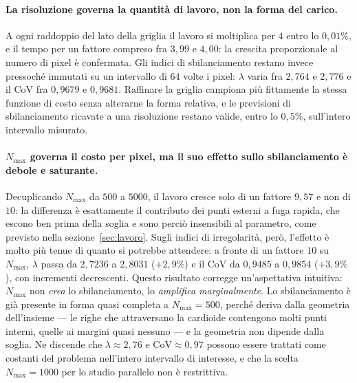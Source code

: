 \paragraph{La risoluzione governa la quantità di lavoro, non la forma del carico.}
A ogni raddoppio del lato della griglia il lavoro si moltiplica per $4$ entro lo
$0{,}01\%$, e il tempo per un fattore compreso fra $3{,}99$ e $4{,}00$: la
crescita proporzionale al numero di pixel è confermata. Gli indici di
sbilanciamento restano invece pressoché immutati su un intervallo di $64$ volte
i pixel: $\lambda$ varia fra $2{,}764$ e $2{,}776$ e il $\mathrm{CoV}$ fra
$0{,}9679$ e $0{,}9681$. Raffinare la griglia campiona più fittamente la stessa
funzione di costo senza alterarne la forma relativa, e le previsioni di
sbilanciamento ricavate a una risoluzione restano valide, entro lo $0{,}5\%$,
sull'intero intervallo misurato.


\paragraph{$N_{\max}$ governa il costo per pixel, ma il suo effetto sullo
sbilanciamento è debole e saturante.}
Decuplicando $N_{\max}$ da $500$ a $5000$, il lavoro cresce solo di un
fattore $9{,}57$ e non di $10$: la differenza è esattamente il
contributo dei punti esterni a fuga rapida, che escono ben prima della
soglia e sono perciò insensibili al parametro, come previsto nella
sezione~\ref{sec:lavoro}.  Sugli indici di irregolarità, però, l'effetto è
molto più tenue di quanto si potrebbe attendere: a fronte di un
fattore $10$ su $N_{\max}$, $\lambda$ passa da $2{,}7236$ a $2{,}8031$
($+2{,}9\%$) e il $\mathrm{CoV}$ da $0{,}9485$ a $0{,}9854$
($+3{,}9\%$), con incrementi decrescenti.  Questo risultato corregge
un'aspettativa intuitiva: $N_{\max}$ non \emph{crea} lo sbilanciamento,
lo \emph{amplifica marginalmente}.  Lo sbilanciamento è già presente in
forma quasi completa a $N_{\max}=500$, perché deriva dalla geometria
dell'insieme --- le righe che attraversano la cardioide contengono molti
punti interni, quelle ai margini quasi nessuno --- e la geometria non
dipende dalla soglia.  Ne discende che $\lambda \approx 2{,}76$ e
$\mathrm{CoV} \approx 0{,}97$ possono essere trattati come costanti del
problema nell'intero intervallo di interesse, e che la scelta
$N_{\max} = 1000$ per lo studio parallelo non è restrittiva.

